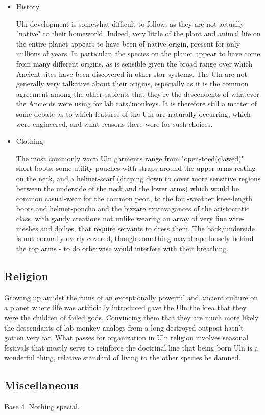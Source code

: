 \begin{itemize}

\item History

Uln development is somewhat difficult to follow, as they are not
actually "native" to their homeworld. Indeed, very little of the plant
and animal life on the entire planet appears to have been of native
origin, present for only millions of years. In particular, the species
on the planet appear to have come from many different origins, as is
sensible given the broad range over which Ancient sites have been
discovered in other star systems. The Uln are not generally very
talkative about their origins, especially as it is the common
agreement among the other sapients that they're the descendents of
whatever the Ancients were using for lab rats/monkeys. It is therefore
still a matter of some debate as to which features of the Uln are
naturally occurring, which were engineered, and what reasons there
were for such choices.

\item Clothing

The most commonly worn Uln garments range from "open-toed(clawed)"
short-boots, some utility pouches with straps around the upper arms
resting on the neck, and a helmet-scarf (draping down to cover more
sensitive regions between the underside of the neck and the lower
arms) which would be common casual-wear for the common peon, to the
foul-weather knee-length boots and helmet-poncho and the bizzare
extravagances of the aristocratic class, with gaudy creations not
unlike wearing an array of very fine wire-meshes and doilies, that
require servants to dress them. The back/underside is not normally
overly covered, though something may drape loosely behind the top arms
- to do otherwise would interfere with their breathing.
\end{itemize}

\subsection{Religion}

Growing up amidst the ruins of an exceptionally powerful and ancient
culture on a planet where life was artificially introduced gave the
Uln the idea that they were the children of failed gods. Convincing
them that they are much more likely the descendants of
lab-monkey-analogs from a long destroyed outpost hasn't gotten very
far. What passes for organization in Uln religion involves seasonal
festivals that mostly serve to reinforce the doctrinal line that being
born Uln is a wonderful thing, relative standard of living to the
other species be damned.

\subsection{Miscellaneous}

Base 4. Nothing special. 
